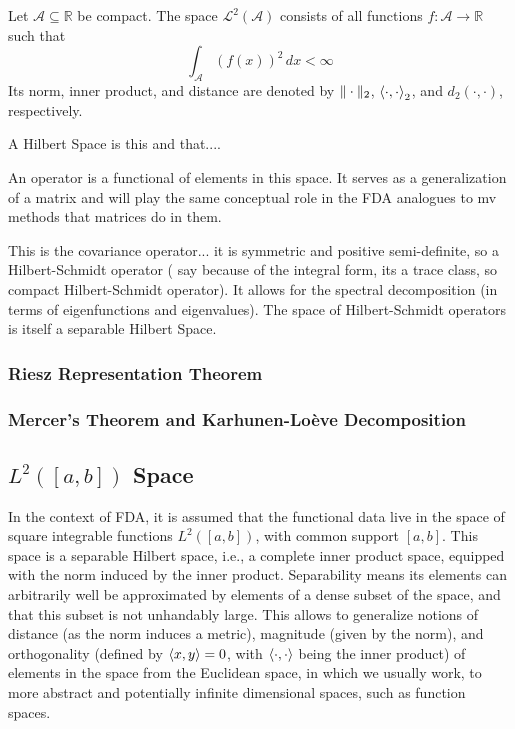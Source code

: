 \begin{definition}
    Let $\mathcal{A} \subseteq \mathbb{R}$ be compact. The space \( \mathcal{L}^2(\mathcal{A}) \)
    consists of all functions \( f: \mathcal{A} \to \mathbb{R} \) such that
    \[
    \int_{\mathcal{A}} (f(x))^2 \, dx < \infty
    \]
    Its norm, inner product, and distance are denoted by $\|\cdot\|_2$,
    $\left \langle \cdot, \cdot \right \rangle_2$, and $d_2(\cdot, \cdot)$, respectively.
\end{definition}

A Hilbert Space is this and that....

An operator is a functional of elements in this space. It serves as a generalization of
a matrix and will play the same conceptual role in the FDA analogues to mv methods
that matrices do in them.

This is the covariance operator... it is symmetric and positive semi-definite, so
a Hilbert-Schmidt operator (\textcite{WangChiouMüller2016} say because of the integral form,
its a trace class, so compact Hilbert-Schmidt operator). It allows for the spectral
decomposition (in terms of eigenfunctions and eigenvalues). The space of Hilbert-Schmidt
operators is itself a separable Hilbert Space.

\subsubsection{Riesz Representation Theorem}
\label{sec:riesz}

\subsubsection{Mercer's Theorem and Karhunen-Loève Decomposition}
\label{sec:mercer and kh}

\subsection{$L^2([a, b])$ Space}
\label{sec:l2 space}
In the context of FDA, it is assumed that the functional data live in
the space of square integrable functions $L^2([a,b])$, with common
support $[a,b]$. This space is a separable Hilbert space, i.e., a complete inner
product space, equipped with the norm induced by the inner product. Separability means
its elements can arbitrarily well be approximated by elements of a dense subset of the
space, and that this subset is not unhandably large.
This allows to generalize notions of distance (as the norm induces a
metric), magnitude (given by the norm), and orthogonality (defined by
$\left \langle x, y \right \rangle = 0$, with $\left \langle \cdot, \cdot \right \rangle$ being the inner product) of elements
in the space from the Euclidean space, in which we usually work, to more
abstract and potentially infinite dimensional spaces, such as function
spaces.

